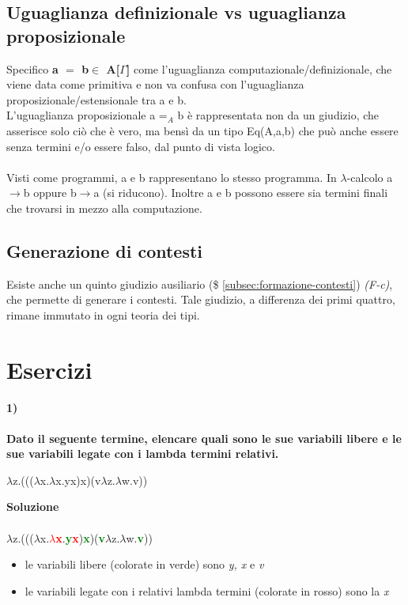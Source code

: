 \subsection{Uguaglianza definizionale vs uguaglianza proposizionale}
\label{subsec:uguaglianza-computazionale-proposizionale}
Specifico \textbf{a $=$ b$\in$ A[$\Gamma$]} come l'uguaglianza computazionale/definizionale, che viene data come primitiva e non va confusa con l'uguaglianza proposizionale/estensionale tra a e b.\\L'uguaglianza proposizionale a =$_A$ b \`e rappresentata non da un giudizio, che asserisce solo ci\`o che \`e vero, ma bens\`i da un tipo Eq(A,a,b) che pu\`o anche essere senza termini e/o essere falso, dal punto di vista logico.\\\\
Visti come programmi, a e b rappresentano lo stesso programma. In $\lambda$-calcolo a$\rightarrow$b oppure b$\rightarrow$a (si riducono). Inoltre a e b possono essere sia termini finali che trovarsi in mezzo alla computazione.
\subsection{Generazione di contesti}
\label{subsec:generazione-di-contesti}
Esiste anche un quinto giudizio ausiliario (\$ \ref{subsec:formazione-contesti}) \textit{(F-c)}, che permette di generare i contesti. Tale giudizio, a differenza dei primi quattro, rimane immutato in ogni teoria dei tipi.

\section{Esercizi}
\label{subsec: lambda-calcolo-puro}
\paragraph{1)} 
\textbf{Dato il seguente termine, elencare quali sono le sue variabili libere e le sue variabili legate con i lambda termini relativi.}
\begin{center}$\lambda$z.((($\lambda$x.$\lambda$x.yx)x)(v$\lambda$z.$\lambda$w.v))\end{center}
\textbf{Soluzione}\\\\
$\lambda$z.((($\lambda$x.\textbf{\textcolor{red}{$\lambda$x}}.\textbf{\textcolor{green}{y}\textcolor{red}{x}})\textbf{\textcolor{green}{x}})(\textbf{\textcolor{green}{v}}$\lambda$z.$\lambda$w.\textbf{\textcolor{green}{v}}))
\begin{itemize}
\item le variabili libere (colorate in verde) sono \textit{y, x} e \textit{v}
\item le variabili legate con i relativi lambda termini (colorate in rosso) sono la \textit{x}
\end{itemize}

